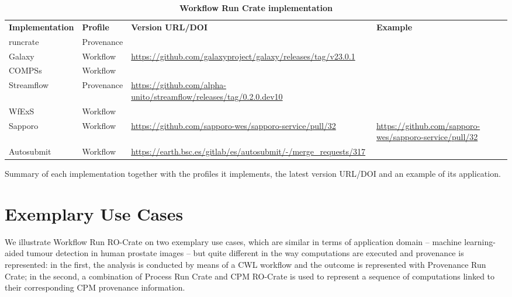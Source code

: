 \documentclass[10pt,letterpaper]{article}
\newlength\savedwidth
\newcommand\thickhline{\noalign{\global\savedwidth\arrayrulewidth\global\arrayrulewidth 2pt}%
\hline
\noalign{\global\arrayrulewidth\savedwidth}}
\begin{document}
\begin{table}[!ht]
  \begin{adjustwidth}{-1.4cm}{0in} %
  \centering
  \caption{
  {\bf Workflow Run Crate implementation}}
  \begin{tabular}{l|l|l|l}
  \hline
  {\bf Implementation} & {\bf Profile} & {\bf Version URL/DOI} &
  {\bf Example}\\
  \thickhline
  runcrate & Provenance & \cite{Leo 2023a}  & \cite{run-pathology} \\
  Galaxy & Workflow & \tiny \url{https://github.com/galaxyproject/galaxy/releases/tag/v23.0.1} & \cite{De Geest 2023} \\
  COMPSs & Workflow & \cite{Ejarque 2023} & \cite{Poiata 2023} \\
  Streamflow & Provenance & \tiny \url{https://github.com/alpha-unito/streamflow/releases/tag/0.2.0.dev10} & \cite{Colonnelli 2023} \\
  WfExS & Workflow & \cite{Fernández 2023a} & \cite{Fernández 2023b} \\
  Sapporo & Workflow & \tiny \url{https://github.com/sapporo-wes/sapporo-service/pull/32} & \tiny \url{https://github.com/sapporo-wes/sapporo-service/pull/32} \\
  Autosubmit & Workflow & \tiny \url{https://earth.bsc.es/gitlab/es/autosubmit/-/merge_requests/317} & \cite{Kinoshita 2023} \\
  \end{tabular}
  \begin{flushleft} 
    Summary of each implementation together with the profiles it implements, the latest version URL/DOI and an example of its application.
  \end{flushleft}
  \label{implementation_summary_table}
  \end{adjustwidth}
\end{table}
  


\section{Exemplary Use Cases}\label{exemplary-use-cases}

We illustrate Workflow Run RO-Crate on two exemplary use cases, which are similar in terms of application domain -- machine learning-aided tumour detection in human prostate images -- but quite different in the way computations are executed and provenance is represented: in the first, the analysis is conducted by means of a CWL workflow and the outcome is represented with Provenance Run Crate; in the second, a combination of Process Run Crate and CPM RO-Crate is used to represent a sequence of computations linked to their corresponding CPM provenance information.
\end{document}
